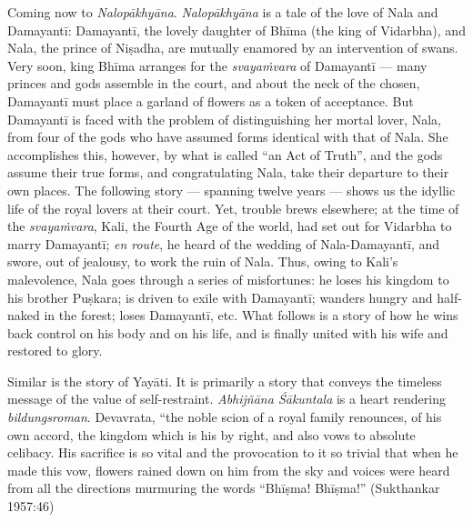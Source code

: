 Coming now to {\sl Nalopākhyāna}. {\sl Nalopākhyāna} is a tale of the love of Nala and Damayantī: Damayantī, the lovely daughter of Bhīma (the king of Vidarbha), and Nala, the prince of Niṣadha, are mutually enamored by an intervention of swans. Very soon, king Bhīma arranges for the {\sl svayaṁvara} of Damayantī --- many princes and gods assemble in the court, and about the neck of the chosen, Damayantī must place a garland of flowers as a token of acceptance. But Damayantī is faced with the problem of distinguishing her mortal lover, Nala, from four of the gods who have assumed forms identical with that of Nala. She accomplishes this, however, by what is called “an Act of Truth”, and the gods assume their true forms, and congratulating Nala, take their departure to their own places. The following story --- spanning twelve years --- shows us the idyllic life of the royal lovers at their court. Yet, trouble brews elsewhere; at the time of the {\sl svayaṁvara}, Kali, the Fourth Age of the world, had set out for Vidarbha to marry Damayantī; {\sl en route}, he heard of the wedding of Nala-Damayantī, and swore, out of jealousy, to work the ruin of Nala. Thus, owing to Kali's malevolence, Nala goes through a series of misfortunes: he loses his kingdom to his brother Puṣkara; is driven to exile with Damayantī; wanders hungry and half-naked in the forest; loses Damayantī, etc. What follows is a story of how he wins back control on his body and on his life, and is finally united with his wife and restored to glory. 
\vskip 1.3pt

Similar is the story of Yayāti. It is primarily a story that conveys the timeless message of the value of self-restraint. {\sl Abhijñāna Śākuntala} is a heart rendering {\sl bildungsroman}. Devavrata, “the noble scion of a royal family renounces, of his own accord, the kingdom which is his by right, and also vows to absolute celibacy. His sacrifice is so vital and the provocation to it so trivial that when he made this vow, flowers rained down on him from the sky and voices were heard from all the directions murmuring the words “Bhīṣma! Bhīṣma!” (Sukthankar 1957:46)
\vskip 1.3pt

